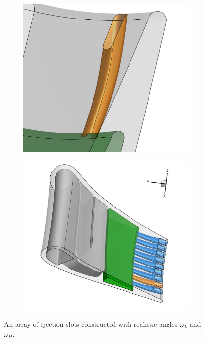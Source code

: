 \documentclass[a4paper, 11pt]{report}
\theoremstyle{definition}
\begin{document}
	\begin{figure}[H]
		\centering
		\begin{subfigure}{.35\textwidth}
			\includegraphics[width=\textwidth]{../tec/slots/12.png}
		\end{subfigure}
		\begin{subfigure}{.35\textwidth}
			\includegraphics[width=\textwidth]{../tec/slots/11.png}
		\end{subfigure}
		\caption{An array of ejection slots constructed with realistic angles $\omega_L$ and $\omega_H$.}
		\label{fig:slots_real}
	\end{figure}
\end{document}
